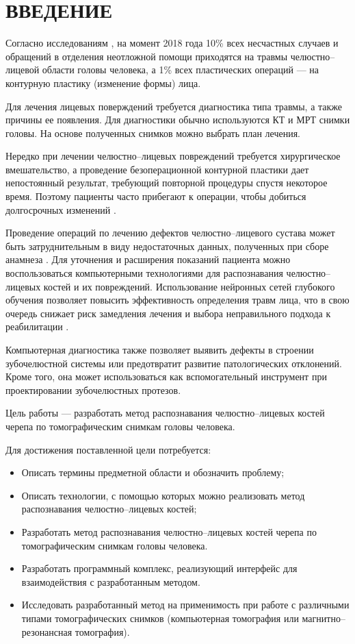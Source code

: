 \section*{ВВЕДЕНИЕ}

Согласно исследованиям \cite{facialfracs0}\cite{isaps}, на момент 2018 года 10\% всех несчастных случаев и обращений в отделения неотложной помощи приходятся на травмы челюстно--лицевой области головы человека, а 1\% всех пластических операций --- на контурную пластику (изменение формы) лица.

Для лечения лицевых поверждений требуется диагностика типа травмы, а также причины ее появления. Для диагностики обычно используются КТ и МРТ снимки головы. На основе полученных снимков можно выбрать план лечения.

Нередко при лечении челюстно--лицевых повреждений требуется хирургическое вмешательство, а проведение безоперационной контурной пластики дает непостоянный результат, требующий повторной процедуры спустя некоторое время. Поэтому пациенты часто прибегают к операции, чтобы добиться долгосрочных изменений \cite{isaps}.

Проведение операций по лечению дефектов челюстно--лицевого сустава может быть затруднительным в виду недостаточных данных, полученных при сборе анамнеза \cite{facialfracs1}. Для уточнения и расширения показаний пациента можно воспользоваться компьютерными технологиями для распознавания челюстно--лицевых костей и их повреждений. Использование нейронных сетей глубокого обучения позволяет повысить эффективность определения травм лица, что в свою очередь снижает риск замедления лечения и выбора неправильного подхода к реабилитации \cite{facialfracs2}.

Компьютерная диагностика также позволяет выявить дефекты в строении зубочелюстной системы или предотвратит развитие патологических отклонений. Кроме того, она может использоваться как вспомогательный инструмент при проектировании зубочелюстных протезов.

Цель работы --- разработать метод распознавания челюстно--лицевых костей черепа по томографическим снимкам головы человека.

Для достижения поставленной цели потребуется:
\begin{itemize}
\item Описать термины предметной области и обозначить проблему;
\item Описать технологии, с помощью которых можно реализовать метод распознавания челюстно--лицевых костей;
\item Разработать метод распознавания челюстно--лицевых костей черепа по томографическим снимкам головы человека.
\item Разработать программный комплекс, реализующий интерфейс для взаимодействия с разработанным методом.
\item Исследовать разработанный метод на применимость при работе с различными типами томографических снимков (компьютерная томография или магнитно--резонансная томография).
\end{itemize}